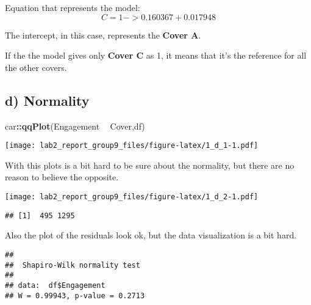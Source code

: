 \documentclass[
]{article}
\newenvironment{Shaded}{\begin{snugshade}}{\end{snugshade}}
\newcommand{\KeywordTok}[1]{\textcolor[rgb]{0.13,0.29,0.53}{\textbf{#1}}}
\newcommand{\NormalTok}[1]{#1}
\newcommand{\OperatorTok}[1]{\textcolor[rgb]{0.81,0.36,0.00}{\textbf{#1}}}
\newcommand{\StringTok}[1]{\textcolor[rgb]{0.31,0.60,0.02}{#1}}
\begin{document}
Equation that represents the model: \begin{equation}
C = 1 -> 0.160367 + 0.017948
\end{equation}

The intercept, in this case, represents the \textbf{Cover A}.

If the the model gives only \textbf{Cover C} as 1, it means that it's
the reference for all the other covers.

\hypertarget{d-normality}{%
\subsection{d) Normality}\label{d-normality}}

\begin{Shaded}
\begin{Highlighting}[]
\NormalTok{car}\OperatorTok{::}\KeywordTok{qqPlot}\NormalTok{(Engagement }\OperatorTok{~}\StringTok{ }\NormalTok{Cover,df)}
\end{Highlighting}
\end{Shaded}

\texttt{[image: lab2\_report\_group9\_files/figure-latex/1\_d\_1-1.pdf]}

With this plots is a bit hard to be sure about the normality, but there
are no reason to believe the opposite.

\begin{Shaded}
\end{Shaded}

\texttt{[image: lab2\_report\_group9\_files/figure-latex/1\_d\_2-1.pdf]}

\begin{verbatim}
## [1]  495 1295
\end{verbatim}

Also the plot of the residuals look ok, but the data visualization is a
bit hard.

\begin{Shaded}
\end{Shaded}

\begin{verbatim}
## 
##  Shapiro-Wilk normality test
## 
## data:  df$Engagement
## W = 0.99943, p-value = 0.2713
\end{verbatim}
\end{document}
